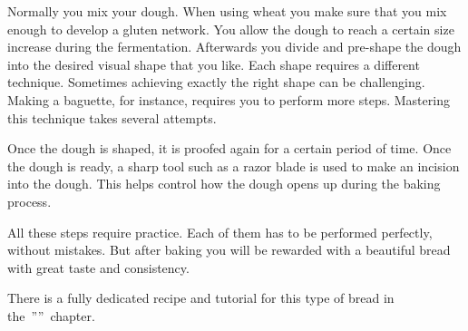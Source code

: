 Normally you mix your dough. When using wheat you make sure
that you mix enough to develop a gluten network.
You allow the dough to reach
a certain size increase during the fermentation. Afterwards you divide and pre-shape
the dough into the desired visual shape that you like.
Each shape requires a different technique. Sometimes achieving
exactly the right shape can be challenging. Making a baguette,
for instance, requires you to perform more steps. Mastering this
technique takes several attempts.

Once the dough is shaped, it is proofed again for a certain
period of time. Once the dough is ready, a sharp tool such
as a razor blade is used to make an incision into the dough.
This helps control how the dough opens up during the baking process.

All these steps require practice. Each of them has to be
performed perfectly, without mistakes.
But after baking you will be rewarded with a beautiful bread
with great taste and consistency.

There is a fully dedicated recipe and tutorial
for this type of bread in the~''''~chapter.

